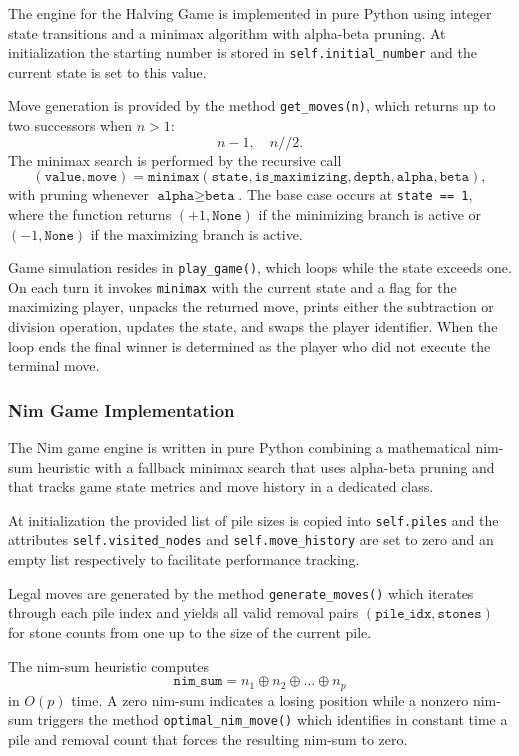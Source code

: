 \documentclass[12pt]{article}
\begin{document}
The engine for the Halving Game is implemented in pure Python using integer state transitions and a minimax algorithm with alpha-beta pruning. At initialization the starting number is stored in \texttt{self.initial\_number} and the current state is set to this value.

Move generation is provided by the method \texttt{get\_moves(n)}, which returns up to two successors when \(n>1\):
\[
n-1,\quad n\mathbin{//}2.
\]
The minimax search is performed by the recursive call
\[
(\texttt{value},\texttt{move}) = \texttt{minimax}(\texttt{state},\texttt{is\_maximizing},\texttt{depth},\texttt{alpha},\texttt{beta}),
\]
with pruning whenever \(\texttt{alpha}\ge\texttt{beta}\). The base case occurs at \texttt{state == 1}, where the function returns \((+1,\texttt{None})\) if the minimizing branch is active or \((-1,\texttt{None})\) if the maximizing branch is active.

Game simulation resides in \texttt{play\_game()}, which loops while the state exceeds one. On each turn it invokes \texttt{minimax} with the current state and a flag for the maximizing player, unpacks the returned move, prints either the subtraction or division operation, updates the state, and swaps the player identifier. When the loop ends the final winner is determined as the player who did not execute the terminal move.


\subsubsection{Nim Game Implementation}

The Nim game engine is written in pure Python combining a mathematical nim-sum \gls{heuristic} with a fallback minimax search that uses alpha-beta pruning and that tracks game state metrics and move history in a dedicated class.

At initialization the provided list of pile sizes is copied into \texttt{self.piles} and the attributes \texttt{self.visited\_nodes} and \texttt{self.move\_history} are set to zero and an empty list respectively to facilitate performance tracking.

Legal moves are generated by the method \texttt{generate\_moves()} which iterates through each pile index and yields all valid removal pairs \((\texttt{pile\_idx},\texttt{stones})\) for stone counts from one up to the size of the current pile.

The nim-sum heuristic computes
\[
\texttt{nim\_sum} = n_1 \oplus n_2 \oplus \dots \oplus n_p
\]
in \(O(p)\) time. A zero nim-sum indicates a losing position while a nonzero nim-sum triggers the method \texttt{optimal\_nim\_move()} which identifies in constant time a pile and removal count that forces the resulting nim-sum to zero.
\end{document}
